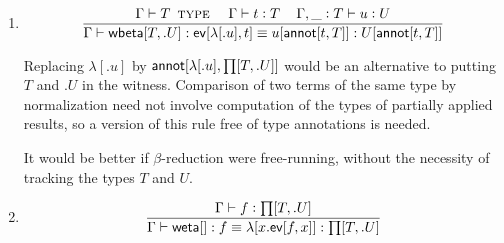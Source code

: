 \documentclass[11pt]{article}
\newcommand{\eqd}{\equiv}
\newcommand{\spc}{{\,\,\,\,\,\,\,}}
\newcommand{\ccolon}[1]{\vcentcolon#1}
\newcommand{\ccheck}[1]{\vcentcolon#1}  %
\newcommand{\synth}[1]{\vcentcolon(\Rightarrow#1)} %
\renewcommand{\synth}[1]{\ccheck#1} %
\newcommand{\Type}{\mathop{\text{ \sc type}}}
\newcommand{\ha}[2]{#1[#2]}
\newcommand{\weta}{{\sf weta}}
\newcommand{\annot}{{\sf annot}}
\newcommand{\ev}{{\sf ev}}
\newcommand{\wbeta}{{\sf wbeta}}
\newcommand{\var}{\char`_}
\begin{document}
\begin{enumerate}
For simplicity, assume that $f'$ is $f$, and observe that $\Gamma \vdash
\ha\ev{f',t'} \synth{U[\ha\annot{t,T}]}$ may not be valid, even though $\Gamma
\vdash \ha\ev{f',t'} \synth{U[\ha\annot{t',T}]}$ is.  Nevertheless, $\Gamma \vdash
\ha\ev{f',t'} : U[\ha\annot{t,T}]$ is valid in the underlying type theory where
the witnesses have been forgotten.

\item 
\[\frac{ \Gamma \vdash T \Type \spc \Gamma\vdash t \ccheck{T}\spc \Gamma, \var \ccolon{T}\vdash u \ccheck{U}}{\Gamma\vdash \ha\wbeta{T,.U} : \ha\ev{\ha\lambda{.u},t} \eqd u[\ha\annot{t,T}] : U[\ha\annot{t,T}]}\]

Replacing $\ha\lambda{.u}$ by $\ha\annot{\ha\lambda{.u},\ha\prod{T,.U}}$ would
be an alternative to putting $T$ and $.U$ in the witness.  Comparison of two
terms of the same type by normalization need not involve computation of the
types of partially applied results, so a version of this rule free of type
annotations is needed.

It would be better if $\beta$-reduction were free-running, without the
necessity of tracking the types $T$ and $U$.

\item 
\[
  \frac{\Gamma\vdash f \ccheck{\ha\prod{T,.U}}}
       {\Gamma\vdash \ha\weta{} : f \eqd \ha\lambda{x.\ha\ev{f,x}} : \ha\prod{T,.U}}
\]

\end{enumerate}



\end{document}
